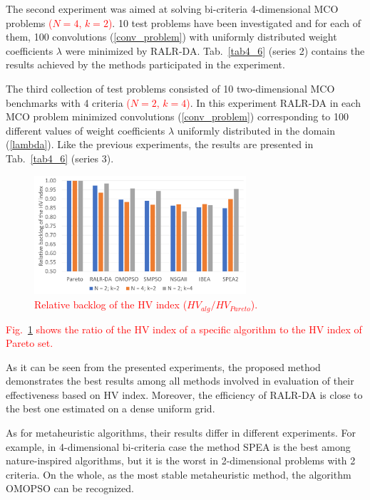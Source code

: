 \documentclass[runningheads]{llncs}
\begin{document}
The second experiment was aimed at solving bi-criteria 4-dimensional MCO problems \textcolor{red}{($N=4$, $k=2$)}. 10 test problems have been investigated and for each of them, 100 convolutions (\ref{conv_problem}) with uniformly distributed weight coefficients $\lambda$ were minimized by RALR-DA. Tab.~\ref{tab4_6} (series 2) contains the results achieved by the methods participated in the experiment.

The third collection of test problems consisted of 10 two-dimensional MCO benchmarks with 4 criteria \textcolor{red}{($N=2$, $k=4$)}. In this experiment RALR-DA in each MCO problem minimized convolutions (\ref{conv_problem}) corresponding to 100 different values of weight coefficients $\lambda$ uniformly distributed in the domain (\ref{lambda}). Like  the  previous experiments, the results are presented in Tab.~\ref{tab4_6} (series 3).


\begin{figure}
\centering
\includegraphics[width=0.7\textwidth]{fig4_6.pdf} 
\caption{\textcolor{red}{ Relative backlog of the HV index ($HV_{alg} / HV_{Pareto} $). }}\label{fig4_6} 
\end{figure}

\textcolor{red}{Fig.~\ref{fig4_6} shows the ratio of the HV index of a specific algorithm to the HV index of Pareto set.}

As it can be seen from the presented experiments, the proposed method demonstrates the best results among all methods involved in evaluation of their effectiveness based on HV index. Moreover, the efficiency of RALR-DA is close to the best one estimated on a dense uniform grid.

As for metaheuristic algorithms, their results differ in different experiments.  For example, in 4-dimensional bi-criteria case the method SPEA is the best among nature-inspired algorithms, but it is the worst in 2-dimensional problems with 2 criteria. On the whole, as the most stable metaheuristic method, the algorithm OMOPSO can be recognized.
\end{document}
